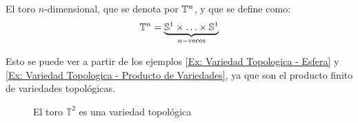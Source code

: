 \begin{example}[$n-$Toro]\label{Ex: Variedad Topologica - Toro}
	El toro $n$-dimensional, que se denota por $\mathbb{T}^n$, y que se define como:
	\[
		\mathbb{T}^n = \underbrace{\mathbb{S}^1 \times \hdots \times \mathbb{S}^1}_{n-\text{veces}}
	\]

	Esto se puede ver a partir de los ejemplos \ref{Ex: Variedad Topologica - Esfera} y \ref{Ex: Variedad Topologica - Producto de Variedades}, ya que son el producto finito de variedades topológicas.
\end{example}

\begin{figure}[h]
	\centering
	
	\caption{El toro $\mathbb{T}^{2}$ es una variedad topológica}
\end{figure}
